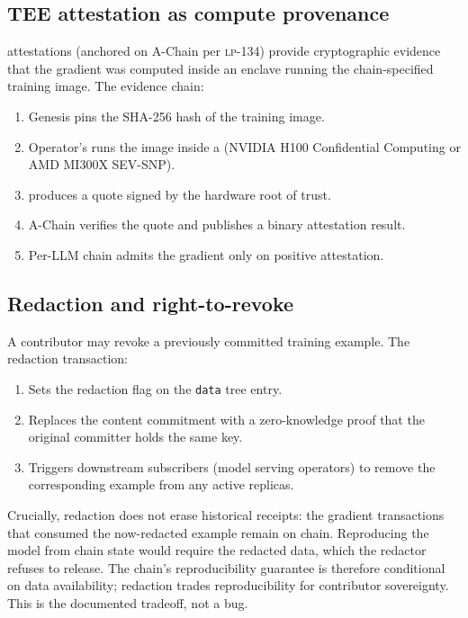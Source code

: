 \subsection{TEE attestation as compute provenance}

\TEE{} attestations (anchored on \Lux{} A-Chain per \textsc{lp-134}) provide cryptographic evidence that the gradient was computed inside an enclave running the chain-specified training image. The evidence chain:
\begin{enumerate}[nosep]
\item Genesis pins the SHA-256 hash of the training image.
\item Operator's \GPU{} runs the image inside a \TEE{} (NVIDIA H100 Confidential Computing or AMD MI300X SEV-SNP).
\item \TEE{} produces a quote signed by the hardware root of trust.
\item A-Chain verifies the quote and publishes a binary attestation result.
\item Per-LLM chain admits the gradient only on positive attestation.
\end{enumerate}

\subsection{Redaction and right-to-revoke}

A contributor may revoke a previously committed training example. The redaction transaction:
\begin{enumerate}[nosep]
\item Sets the redaction flag on the \texttt{data} tree entry.
\item Replaces the content commitment with a zero-knowledge proof that the original committer holds the same key.
\item Triggers downstream subscribers (model serving operators) to remove the corresponding example from any active replicas.
\end{enumerate}

Crucially, redaction does not erase historical receipts: the gradient transactions that consumed the now-redacted example remain on chain. Reproducing the model from chain state would require the redacted data, which the redactor refuses to release. The chain's reproducibility guarantee is therefore conditional on data availability; redaction trades reproducibility for contributor sovereignty. This is the documented tradeoff, not a bug.

